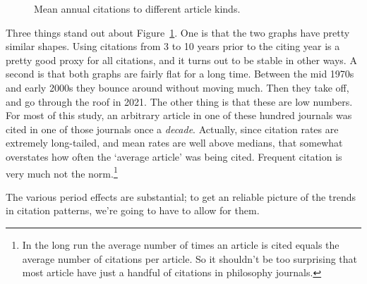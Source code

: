 \documentclass[
  12pt,
  letterpaper,
  DIV=11,
  numbers=noendperiod]{scrartcl}
\begin{document}
\begin{figure}
\begin{minipage}{\linewidth}
{}


\end{minipage}%

\caption{\label{fig-citationrate}Mean annual citations to different
article kinds.}

\end{figure}%

Three things stand out about Figure~\ref{fig-citationrate}. One is that
the two graphs have pretty similar shapes. Using citations from 3 to 10
years prior to the citing year is a pretty good proxy for all citations,
and it turns out to be stable in other ways. A second is that both
graphs are fairly flat for a long time. Between the mid 1970s and early
2000s they bounce around without moving much. Then they take off, and go
through the roof in 2021. The other thing is that these are low numbers.
For most of this study, an arbitrary article in one of these hundred
journals was cited in one of those journals once a \emph{decade}.
Actually, since citation rates are extremely long-tailed, and mean rates
are well above medians, that somewhat overstates how often the `average
article' was being cited. Frequent citation is very much not the
norm.\footnote{In the long run the average number of times an article is
  cited equals the average number of citations per article. So it
  shouldn't be too surprising that most article have just a handful of
  citations in philosophy journals.}

The various period effects are substantial; to get an reliable picture
of the trends in citation patterns, we're going to have to allow for
them.
\end{document}
